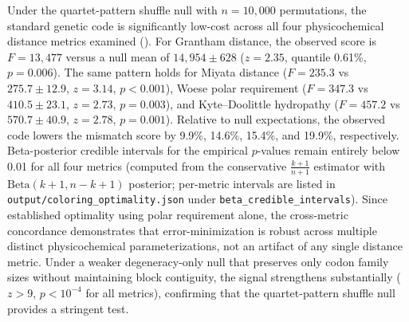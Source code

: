\documentclass[preprint,11pt,authoryear,a4paper]{elsarticle}
\begin{document}
Under the quartet-pattern shuffle null with \(n = 10,000\) permutations,
the standard genetic code is significantly low-cost across all four
physicochemical distance metrics examined (). For
Grantham distance, the observed score is \(F = 13,477\) versus a null
mean of \(14,954 \pm 628\) (\(z = 2.35\), quantile 0.61\%,
\(p = 0.006\)). The same pattern holds for Miyata distance
(\(F = 235.3\) vs \(275.7 \pm 12.9\), \(z = 3.14\), \(p < 0.001\)),
Woese polar requirement (\(F = 347.3\) vs \(410.5 \pm 23.1\),
\(z = 2.73\), \(p = 0.003\)), and Kyte--Doolittle hydropathy
(\(F = 457.2\) vs \(570.7 \pm 40.9\), \(z = 2.78\), \(p = 0.001\)).
Relative to null expectations, the observed code lowers the mismatch
score by 9.9\%, 14.6\%, 15.4\%, and 19.9\%, respectively. Beta-posterior
credible intervals for the empirical \(p\)-values remain entirely below
0.01 for all four metrics (computed from the conservative
\(\frac{k + 1}{n + 1}\) estimator with \(\text{Beta}(k + 1,n - k + 1)\)
posterior; per-metric intervals are listed in
\texttt{output/coloring\_optimality.json} under
\texttt{beta\_credible\_intervals}). Since \citep{freeland1998}
established optimality using polar requirement alone, the cross-metric
concordance demonstrates that error-minimization is robust across
multiple distinct physicochemical parameterizations, not an artifact of
any single distance metric. Under a weaker degeneracy-only null that
preserves only codon family sizes without maintaining block contiguity,
the signal strengthens substantially (\(z > 9\), \(p < 10^{- 4}\) for
all metrics), confirming that the quartet-pattern shuffle null provides
a stringent test.
\end{document}

